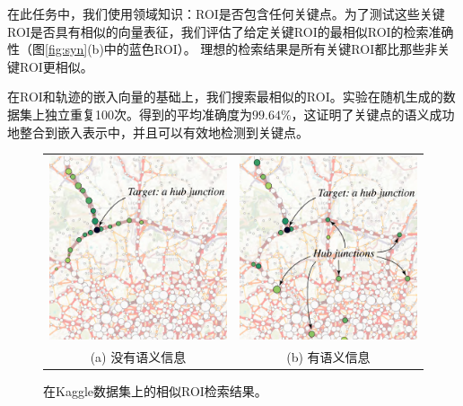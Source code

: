在此任务中，我们使用领域知识：ROI是否包含任何关键点。为了测试这些关键ROI是否具有相似的向量表征，我们评估了给定关键ROI的最相似ROI的检索准确性（图\ref{fig:syn}(b)中的蓝色ROI）。 理想的检索结果是所有关键ROI都比那些非关键ROI更相似。

在ROI和轨迹的嵌入向量的基础上，我们搜索最相似的ROI。实验在随机生成的数据集上独立重复100次。得到的平均准确度为$\boldsymbol{99.64\%}$，这证明了关键点的语义成功地整合到嵌入表示中，并且可以有效地检测到关键点。



\tabcolsep=2pt
\begin{figure}[!t]
\centering
\begin{tabular}{cc}
\includegraphics[width=65mm]{pics/SP3.pdf}&
\includegraphics[width=65mm]{pics/SP4.pdf}\\
(a) 没有语义信息 & (b) 有语义信息
\end{tabular}
\caption{在Kaggle数据集上的相似ROI检索结果。}
\label{fig:regionSim}
\end{figure}

